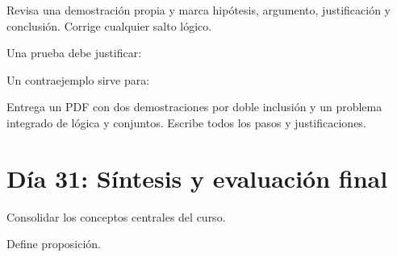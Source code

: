 \begin{activity}[id=dia-30-desarrollo-02,type=long,weight=2]

Revisa una demostración propia y marca hipótesis, argumento, justificación y conclusión. Corrige cualquier salto lógico.

\end{activity}

\begin{activity}[id=dia-30-opcion-01,type=choice,weight=1]

Una prueba debe justificar:





\end{activity}

\begin{activity}[id=dia-30-opcion-02,type=choice,weight=1]

Un contraejemplo sirve para:





\end{activity}

\begin{deliverable}[id=entrega-dia-30,type=upload,weight=3]

Entrega un PDF con dos demostraciones por doble inclusión y un problema integrado de lógica y conjuntos. Escribe todos los pasos y justificaciones.

\end{deliverable}

\section{Día 31: Síntesis y evaluación final}

\begin{lesson}[id=dia-31-lectura,weight=0]

Consolidar los conceptos centrales del curso.

\end{lesson}

\begin{activity}[id=dia-31-corta-01,type=short,weight=1]

Define proposición.

\end{activity}

